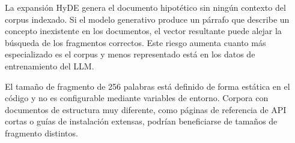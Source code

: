 \documentclass[11pt]{article}
\begin{document}
La expansión HyDE genera el documento hipotético sin ningún contexto del corpus indexado. Si el
modelo generativo produce un párrafo que describe un concepto inexistente en los documentos, el
vector resultante puede alejar la búsqueda de los fragmentos correctos. Este riesgo aumenta
cuanto más especializado es el corpus y menos representado está en los datos de entrenamiento
del LLM.

El tamaño de fragmento de 256 palabras está definido de forma estática en el código y no es
configurable mediante variables de entorno. Corpora con documentos de estructura muy diferente,
como páginas de referencia de API cortas o guías de instalación extensas, podrían beneficiarse
de tamaños de fragmento distintos.
\end{document}
